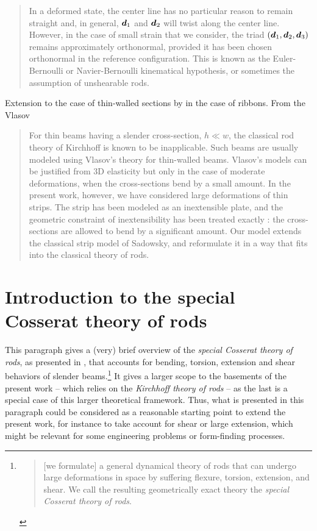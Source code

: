 \blockcquote[p.~68]{Audoly2010}{In a deformed state, the center line has no particular reason to remain straight and, in general, $\boldsymbol{d}_1$ and $\boldsymbol{d}_2$ will twist along the center line. However, in the case of small strain that we consider, the triad $(\boldsymbol{d}_1,\boldsymbol{d}_2,\boldsymbol{d}_3)$ remains approximately orthonormal, provided it has been chosen orthonormal in the reference configuration. This is known as the Euler-Bernoulli or Navier-Bernoulli kinematical hypothesis, or sometimes the assumption of unshearable rods.}

Extension to the case of thin-walled sections by \cite{Dias2015, Vetyukov2014} in the case of ribbons. From the Vlasov

\blockcquote[p.]{Dias2014}{For thin beams having a slender cross-section, $h \ll w$, the classical rod theory of Kirchhoff is known to be inapplicable. Such beams are usually modeled using Vlasov’s theory for thin-walled beams. Vlasov’s models can be justified from 3D elasticity but only in the case of moderate deformations, when the cross-sections bend by a small amount. In the present work, however, we have considered large deformations of thin strips. The strip has been modeled as an inextensible  plate, and the geometric  constraint of inextensibility has been treated exactly : the cross-sections are allowed to bend by a significant amount. Our model extends the classical strip model of Sadowsky, and reformulate it in a way that fits into the classical theory of rods.}

\clearpage
\section{Introduction to the special Cosserat theory of rods}

This paragraph gives a (very) brief overview of the \emph{special Cosserat theory of rods}, as presented in \cite{Antman2005}, that accounts for bending, torsion, extension and shear  behaviors of slender beams.\footnote{\blockcquote[p.~270]{Antman2005}{[we formulate] a general dynamical theory of rods that can undergo large deformations in space by suffering flexure, torsion, extension, and shear. We call the resulting geometrically exact theory the \emph{special Cosserat theory of rods}.}} It gives a larger scope to the basements of the present work -- which relies on the \emph{Kirchhoff theory of rods} -- as the last is a special case of this larger theoretical framework. Thus, what is presented in this paragraph could be considered as a reasonable starting point to extend the present work, for instance to take account for shear or large extension, which might be relevant for some engineering problems or form-finding processes.

